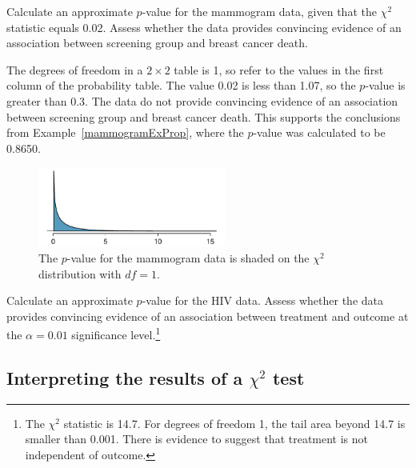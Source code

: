 \begin{example}{Calculate an approximate $p$-value for the mammogram data, given that the $\chi^2$ statistic equals 0.02. Assess whether the data provides convincing evidence of an association between screening group and breast cancer death.}

The degrees of freedom in a $2 \times 2$ table is 1, so refer to the values in the first column of the probability table. The value 0.02 is less than 1.07, so the $p$-value is greater than 0.3. The data do not provide convincing evidence of an association between screening group and breast cancer death. This supports the conclusions from Example~\ref{mammogramExProp}, where the $p$-value was calculated to be 0.8650.

\begin{figure}[h]
	\centering
	\includegraphics[width=0.55\textwidth]{ch_inference_for_props_oi_biostat/figures/mammogramPValue/mammogramPValue}
	\caption{The $p$-value for the mammogram data is shaded on the $\chi^2$ distribution with $df=1$.}
	\label{mammogramPValue}
\end{figure}


\end{example}

\begin{exercise} Calculate an approximate $p$-value for the HIV data. Assess whether the data provides convincing evidence of an association between treatment and outcome at the $\alpha = 0.01$ significance level.\footnote{The $\chi^2$ statistic is 14.7. For degrees of freedom 1, the tail area beyond 14.7 is smaller than 0.001. There is evidence to suggest that treatment is not independent of outcome.}
\label{hivDataPValue}	
\end{exercise}

\subsection{Interpreting the results of a $\chi^2$ test}

